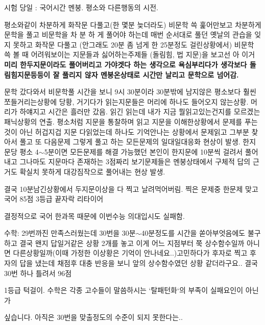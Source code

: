 \vspace{5mm}

시험 당일 : 국어시간 멘붕.
평소와 다른행동의 시전.
\vspace{5mm}

평소와같이 차분하게 화작문 다풀고(한 몇분 늦더라도) 비문학 쓱 훑어만보고 차분하게 문학을 풀고 비문학을 차 분 하 게 풀어야 하는데 매번 순서대로 풀던 옛날의 관습을 잊지 못하고 화작문 다풀고 (안그래도 20분 좀 넘게 한 25분정도 걸린상황에서) 비문학 쓱 볼 때 어려워보이는 지문들과 싫어하는주제들 (돌림힘, 법 지문)을 보고선 아 이거 \textbf{미리 한두지문이라도 풀어버리고 가야겟다 하는 생각으로 욕심부리다가 생각보다 돌림힘지문등등이 잘 풀리지 않자 멘붕온상태로 시간만 날리고 문학으로 넘어감.}
\vspace{5mm}

문학 갔다와서 비문학풀 시간을 보니 9시 30분이라 30분밖에 남지않은 평소보다 훨씬 쪼들거리는상황에 당황, 거기다가 읽는지문들은 머리에 하나도 들어오지 않는상황. 머리가 하얘지고 시간은 흘러만 갔음. 읽긴 읽는데 내가 지금 뭘읽고있는건지를 모르겠는 패닉상황의 연출. 평소처럼 지문을 통찰하며 읽고 지문을 이해한상황에서 문제를 푸는 것이 아닌 허겁지겁 지문 다읽었는데 하나도 기억안나는 상황에서 문제읽고 그부분 찾아서 풀고 또 다음문제 그렇게 풀고 하는 모든문제의 일대일대응화 현상이 발생.
한지문당 평소 4$\sim$5분이면 모든문제를 해결 가능했던 본인이 한지문에 10분씩 걸려서 풀어내고 그나마도 지문마다 존재하는 3점짜리 보기문제들은 멘붕상태에서 구체적 답의 근거도 확실치 못하게 대강짐작으로 풀어내는 현상 발생.
\vspace{5mm}

결국 10분남긴상황에서 두지문이상을 다 찍고 날려먹어버림. 찍은 문제중 한문제 맞고 국어 85점 3등급 끝자락 리타이어
\vspace{5mm}

결정적으로 국어 한과목 때문에 이번수능 의대입시도 실패함.
\vspace{5mm}

수학: 29번까진 만족스러웠는데 30번을 30분$\sim$40분정도를 시간을 쏟아부엇음에도 불구하고 결국 왠지 답일거같은 상황 2개를 놓고 이게 어느 지점부터 쭉 상수함수일까 아니면 다른상황일까(이때 가정한 이상황은 기억이 안나네요..)고민하다가 후자로 찍고 후자의 답을 냈는데 채점후 대충 반응을 보니 앞의 상수함수였던 상황 같더라구요.. 결국 30번 하나 틀려서 96점
\vspace{5mm}

1등급 턱걸이. 수학은 각종 고수들이 말씀하시는 `탈패턴화`의 부족이 실패요인이 아닌가
\vspace{5mm}

싶습니다. 아직은 30번을 맞출정도의 수준이 되지 못한다는..
\vspace{5mm}

